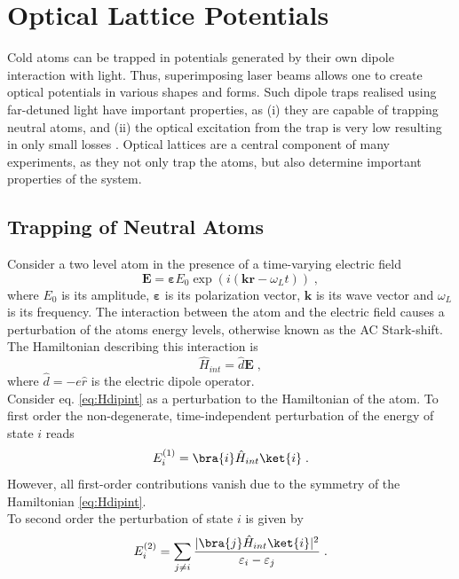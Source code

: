 \section{Optical Lattice Potentials}
Cold atoms can be trapped in potentials generated by their own dipole interaction with light. Thus, superimposing laser beams allows one to create optical potentials in various shapes and forms. Such dipole traps realised using far-detuned light have important properties, as (i) they are capable of trapping neutral atoms, and (ii) the optical excitation from the trap is very low resulting in only small losses \cite{grimm}. Optical lattices are a central component of many experiments, as they not only trap the atoms, but also determine important properties of the system.

\subsection{Trapping of Neutral Atoms}
Consider a two level atom in the presence of a time-varying electric field
\begin{equation}
	\boldsymbol{E} = \boldsymbol{\varepsilon} E_0 \exp \left( i(\boldsymbol{k} \boldsymbol{r} - \omega_L t) \right) \; ,
\end{equation}
where $E_0$ is its amplitude, $\boldsymbol{\varepsilon}$ is its polarization vector, $\boldsymbol{k}$ is its wave vector and $\omega_L$ is its frequency. The interaction between the atom and the electric field causes a perturbation of the atoms energy levels, otherwise known as the AC Stark-shift. The Hamiltonian describing this interaction is
\begin{equation}
	\hat{H}_{int} = \hat{d} \boldsymbol{E} \; , \label{eq:Hdipint}
\end{equation}
where $\hat{d} = -e \hat{r}$ is the electric dipole operator.\\
Consider eq. \eqref{eq:Hdipint} as a perturbation to the Hamiltonian of the atom. To first order the non-degenerate, time-independent perturbation of the energy of state $i$ reads
\begin{equation}
	E_{i}^{(1)} = \bra{i} \hat{H}_{int} \ket{i} \; .
\end{equation}
However, all first-order contributions vanish due to the symmetry of the Hamiltonian \eqref{eq:Hdipint}.\\
To second order the perturbation of state $i$ is given by
\begin{equation}
	E_i^{(2)} = \sum_{j \neq i} \frac{ |\bra{j} \hat{H}_{int}\ket{i}|^2}{\varepsilon_i - \varepsilon_j} \; .
\end{equation}
